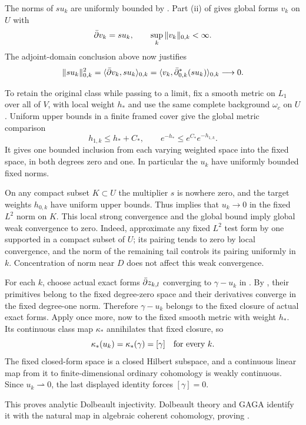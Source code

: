 The norms of $su_k$ are uniformly bounded by
.
Part (ii) of  gives global forms $v_k$
on $U$ with
\[
 \bar\partial v_k=su_k,\qquad \sup_k\|v_k\|_{0,k}<\infty.
\]
The adjoint-domain conclusion above now justifies
\begin{equation}\label{eq:small-target-form}
 \|su_k\|_{0,k}^2
 =\langle\bar\partial v_k,su_k\rangle_{0,k}
 =\langle v_k,\bar\partial^*_{0,k}(su_k)\rangle_{0,k}
 \longrightarrow0.
\end{equation}

To retain the original class while passing to a limit, fix a smooth
metric on $L_1$ over all of $V$, with local weight $h_*$ and use the same complete
background $\omega_c$ on $U$.  Uniform upper bounds in a finite
framed cover give the global metric comparison
\begin{equation}\label{eq:fixed-hilbert-comparison}
 h_{1,k}\le h_*+C_*,\qquad
 e^{-h_*}\le e^{C_*}e^{-h_{1,k}}.
\end{equation}
It gives one bounded inclusion from each varying weighted space into
the fixed space, in both degrees zero and one.  In particular the
$u_k$ have uniformly bounded fixed norms.

On any compact subset $K\subset U$ the multiplier $s$ is nowhere
zero, and the target weights $h_{0,k}$ have uniform upper bounds.
Thus  implies that $u_k\to0$ in the fixed
$L^2$ norm on $K$.  This local strong convergence and the global bound
imply global weak convergence to zero.  Indeed, approximate any fixed
$L^2$ test form by one supported in a compact subset of $U$; its
pairing tends to zero by local convergence, and the norm of the
remaining tail controls its pairing uniformly in $k$.  Concentration
of norm near $D$ does not affect this weak convergence.

For each $k$, choose actual exact forms $\bar\partial z_{k,l}$ converging to
$\gamma-u_k$ in .  By
, their primitives belong to the
fixed degree-zero space and their derivatives converge in the fixed
degree-one norm.  Therefore $\gamma-u_k$ belongs to the fixed closure
of actual exact forms.  Apply  once
more, now to the fixed smooth metric with weight $h_*$.  Its continuous class
map $\kappa_*$ annihilates that fixed closure, so
\[
 \kappa_*(u_k)=\kappa_*(\gamma)=[\gamma]
 \quad\hbox{for every }k.
\]
The fixed closed-form space is a closed Hilbert subspace, and a
continuous linear map from it to finite-dimensional ordinary
cohomology is weakly continuous.  Since $u_k\rightharpoonup0$, the
last displayed identity forces $[\gamma]=0$.

This proves analytic Dolbeault injectivity.  Dolbeault theory and GAGA
identify it with the natural map in algebraic coherent cohomology,
proving .
